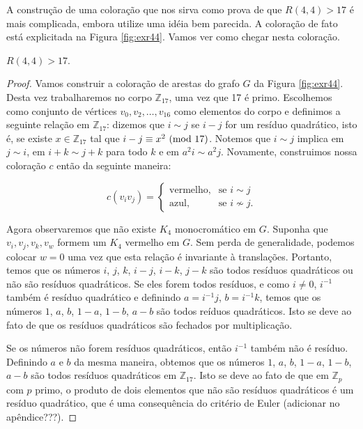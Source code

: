 A construção de uma coloração que nos sirva como prova de que $R(4,4) > 17$ é mais complicada, embora utilize uma idéia bem parecida. A coloração de fato está explicitada na Figura \ref{fig:exr44}. Vamos ver como chegar nesta coloração.

\begin{proposition}
\label{thm:exr34}
$R(4,4) > 17$.
\end{proposition}
\begin{proof}
Vamos construir a coloração de arestas do grafo $G$ da Figura \ref{fig:exr44}. Desta vez trabalharemos no corpo $\mathbb{Z}_{17}$, uma vez que 17 é primo. Escolhemos como conjunto de vértices $v_0, v_2, \dots, v_{16}$ como elementos do corpo e definimos a seguinte relação em $\mathbb{Z}_{17}$: dizemos que $i \sim j$ se $ i - j $ for um resíduo quadrático, isto é, se existe $x \in \mathbb{Z}_{17}$ tal que $i - j \equiv x^2 \ (\text{mod}\ 17)$.
Notemos que $i \sim j$ implica em $ j \sim i$, em $i + k \sim j + k$ para todo $k$ e em $a^2 i \sim a^2 j$. Novamente, construimos nossa coloração $c$ então da seguinte maneira:

\[c(v_i v_j) = \begin{cases}
  \text{vermelho}, & \text{se } i \sim j \\
  \text{azul}, & \text{se } i \not\sim j.
\end{cases}\]

Agora observaremos que não existe $K_4$ monocromático em $G$. Suponha que $v_i, v_j, v_k, v_w$ formem um $K_4$ vermelho em $G$. Sem perda de generalidade, podemos colocar $w = 0$ uma vez que esta relação é invariante à translações. Portanto, temos que os números $i$, $j$, $k$, $i - j$, $i - k$, $j - k$ são todos resíduos quadráticos ou não são resíduos quadráticos.
Se eles forem todos resíduos, e como $i \neq 0$, $i^{-1}$ também é resíduo quadrático e definindo $a = i^{-1}j$, $b = i^{-1}k$, temos que os números $1$, $a$, $b$, $1 - a$, $1- b$, $a - b$ são todos reíduos quadráticos. Isto se deve ao fato de que os resíduos quadráticos são fechados por multiplicação.

Se os números não forem resíduos quadráticos, então $i^{-1}$ também não é resíduo. Definindo $a$ e $b$ da mesma maneira, obtemos que os números $1$, $a$, $b$, $1 - a$, $1- b$, $a - b$ são todos resíduos quadráticos em $\mathbb{Z}_{17}$. Isto se deve ao fato de que em $\mathbb{Z}_{p}$ com $p$ primo, o produto de dois elementos que não são resíduos quadráticos é um resíduo quadrático, que é uma consequência do critério de Euler (adicionar no apêndice???).


\end{proof}
